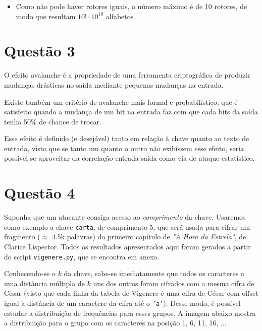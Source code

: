 \documentclass{article}
\begin{document}
\begin{itemize}
    \item Como não pode haver rotores iguais, o número máximo é de 10 rotores, de modo que resultam $10! \cdot 10^{10}$ alfabetos
\end{itemize}

\section*{Questão 3}

O efeito avalanche é a propriedade de uma ferramenta criptográfica de produzir mudanças drásticas no saída mediante pequenas mudanças na entrada. 

Existe também um critério de avalanche mais formal e probabilístico, que é satisfeito quando a mudança de um bit na entrada faz com que cada bits da saída tenha 50\% de chance de trocar.

Esse efeito é definido (e desejável) tanto em relação à chave quanto ao texto de entrada, visto que se tanto um quanto o outro não exibissem esse efeito, seria possível se aproveitar da correlação entrada-saída como via de ataque estatístico.

\section*{Questão 4}

    Suponha que um atacante consiga acesso ao \textit{comprimento} da chave. Usaremos como exemplo a chave \texttt{carta}, de comprimento 5, que será usada para cifrar um fragmento ($\approx$ 4.5k palavras) do primeiro capítulo de \textit{"A Hora da Estrela"}, de Clarice Lispector. Todos os resultados apresentados aqui foram gerados a partir do script \texttt{vigenere.py}, que se encontra em anexo.

    Conhecendo-se o $k$ da chave, sabe-se imediatamente que todos os caracteres a uma distância múltipla de $k$ uns dos outros foram cifrados com a mesma cifra de César (visto que cada linha da tabela de Vigenere é uma cifra de César com offset igual à distância de um caractere da cifra até o \texttt{'a'}). Desse modo, é possível estudar a distribuição de frequências para esses grupos. A imagem abaixo mostra a distribuição para o grupo com os caracteres na posição 1, 6, 11, 16, ...
\end{document}
